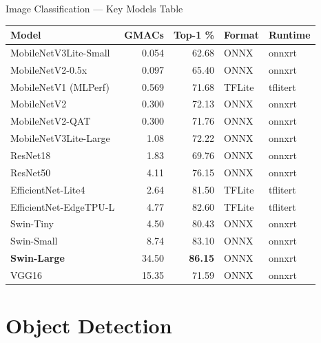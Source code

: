 \documentclass[aspectratio=169,12pt]{beamer}
\begin{document}
\begin{frame}{Image Classification --- Key Models Table}
  \centering
  \footnotesize
  \begin{tabular}{lrrll}
    \toprule
    \textbf{Model} & \textbf{GMACs} & \textbf{Top-1 \%} & \textbf{Format} & \textbf{Runtime} \\
    \midrule
    \rowcolor{TIGray} MobileNetV3Lite-Small & 0.054 & 62.68 & ONNX & onnxrt \\
    MobileNetV2-0.5x & 0.097 & 65.40 & ONNX & onnxrt \\
    \rowcolor{TIGray} MobileNetV1 (MLPerf) & 0.569 & 71.68 & TFLite & tflitert \\
    MobileNetV2 & 0.300 & 72.13 & ONNX & onnxrt \\
    \rowcolor{TIGray} MobileNetV2-QAT & 0.300 & 71.76 & ONNX & onnxrt \\
    MobileNetV3Lite-Large & 1.08 & 72.22 & ONNX & onnxrt \\
    \rowcolor{TIGray} ResNet18 & 1.83 & 69.76 & ONNX & onnxrt \\
    ResNet50 & 4.11 & 76.15 & ONNX & onnxrt \\
    \rowcolor{TIGray} EfficientNet-Lite4 & 2.64 & 81.50 & TFLite & tflitert \\
    EfficientNet-EdgeTPU-L & 4.77 & 82.60 & TFLite & tflitert \\
    \rowcolor{TIGray} Swin-Tiny & 4.50 & 80.43 & ONNX & onnxrt \\
    Swin-Small & 8.74 & 83.10 & ONNX & onnxrt \\
    \rowcolor{TIGray} \textbf{Swin-Large} & 34.50 & \textbf{86.15} & ONNX & onnxrt \\
    VGG16 & 15.35 & 71.59 & ONNX & onnxrt \\
    \bottomrule
  \end{tabular}

  \vspace{0.3cm}
\end{frame}

\section{Object Detection}
\end{document}
